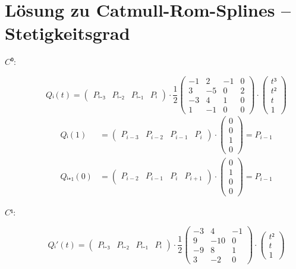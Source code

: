 \documentclass[a4paper,12pt]{scrartcl}
\newcommand{\pmat}[1]{\begin{pmatrix}#1\end{pmatrix}}
\begin{document}
 
\section*{Lösung zu Catmull-Rom-Splines –
  Stetigkeitsgrad}


\begin{description}
\item[$C⁰$:] \mbox{}
  \[ Qᵢ(t) = \pmat{Pᵢ₋₃ & Pᵢ₋₂ & Pᵢ₋₁ & Pᵢ} · \frac12
  \pmat{-1 & 2 & -1 & 0 \\ 3 & -5 & 0 & 2 \\ -3 & 4 & 1 & 0 \\ 1 & -1 & 0 & 0} ·
  \pmat{t³ \\ t² \\ t \\ 1} \]
  \begin{align*}
    Qᵢ(1) &= \pmat{P_{i-3} & P_{i-2} & P_{i-1} & P_{i}} ·
    \pmat{0 \\ 0 \\ 1 \\ 0} = P_{i-1} \\
    Qᵢ₊₁(0) &= \pmat{P_{i-2} & P_{i-1} & P_{i} & P_{i+1}} ·
    \pmat{0 \\ 1 \\ 0 \\ 0} = P_{i-1}
  \end{align*}
\item[$C¹$:] \mbox{}
  \[ Qᵢ'(t) = \pmat{Pᵢ₋₃ & Pᵢ₋₂ & Pᵢ₋₁ & Pᵢ} · \frac12
  \pmat{-3 & 4 & -1 \\ 9 & -10 & 0 \\ -9 & 8 & 1 \\ 3 & -2 & 0} ·
  \pmat{t² \\ t \\ 1} \]
  \begin{align*}

\end{align*}
\end{description}
\end{document}
